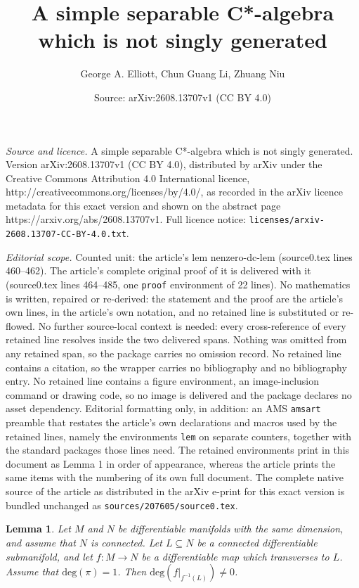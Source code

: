 \documentclass[10pt,a4paper]{amsart}
\title{A simple separable C*-algebra which is not singly generated}
\author{George A. Elliott, Chun Guang Li, Zhuang Niu}
\date{Source: arXiv:2608.13707v1 (CC BY 4.0)}
\newtheorem{lem}{Lemma}
\begin{document}
\maketitle

\noindent\emph{Source and licence.} A simple separable C*-algebra which is not singly generated. Version arXiv:2608.13707v1 (CC BY 4.0), distributed by arXiv under the Creative Commons Attribution 4.0 International licence, http://creativecommons.org/licenses/by/4.0/, as recorded in the arXiv licence metadata for this exact version and shown on the abstract page https://arxiv.org/abs/2608.13707v1. Full licence notice: \texttt{licenses/arxiv-2608.13707-CC-BY-4.0.txt}.\par\smallskip

\noindent\textit{Editorial scope.} Counted unit: the article's lem nenzero-dc-lem (source0.tex lines 460--462). The article's complete original proof of it is delivered with it (source0.tex lines 464--485, one \texttt{proof} environment of 22 lines). No mathematics is written, repaired or re-derived: the statement and the proof are the article's own lines, in the article's own notation, and no retained line is substituted or re-flowed.  No further source-local context is needed: every cross-reference of every retained line resolves inside the two delivered spans.  Nothing was omitted from any retained span, so the package carries no omission record.  No retained line contains a citation, so the wrapper carries no bibliography and no bibliography entry.  No retained line contains a figure environment, an image-inclusion command or drawing code, so no image is delivered and the package declares no asset dependency.  Editorial formatting only, in addition: an AMS \texttt{amsart} preamble that restates the article's own declarations and macros used by the retained lines, namely the environments \texttt{lem} on separate counters, together with the standard packages those lines need.  The retained environments print in this document as Lemma 1 in order of appearance, whereas the article prints the same items with the numbering of its own full document.  The complete native source of the article as distributed in the arXiv e-print for this exact version is bundled unchanged as \texttt{sources/207605/source0.tex}.
\begin{lem}\label{nenzero-dc-lem}
Let $M$ and $N$ be differentiable manifolds with the same dimension, and assume that $N$ is connected. Let $L \subseteq N$ be a connected differentiable submanifold, and let $f: M \to N$ be a differentiable map which transverses to $L$. Assume that $\mathrm{deg}(\pi) = 1$. Then $\mathrm{deg}(f |_{f^{-1}(L)}) \neq 0$.
\end{lem}
\end{document}
